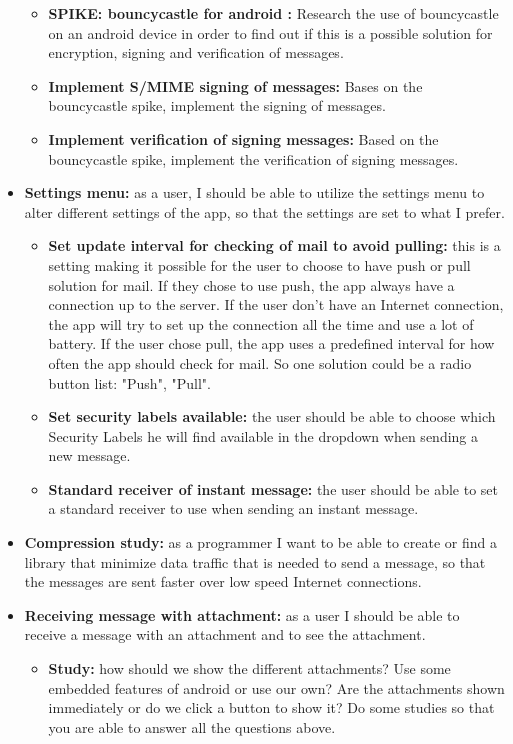 \begin{itemize}
\begin{itemize}
\item{}\textbf{SPIKE: bouncycastle for android :} Research the use of bouncycastle on an android device in order to find out if this is a possible solution for encryption, signing and verification of messages.
\item{}\textbf{Implement S/MIME signing of messages:} Bases on the bouncycastle spike, implement the signing of messages. 
\item{}\textbf{Implement verification of signing messages:} Based on the bouncycastle spike, implement the verification of signing messages.
\end{itemize}

\newpage

\item{}\textbf{Settings menu:} as a user, I should be able to utilize the settings menu to alter different settings of the app, so that the settings are set to what I prefer.
\begin{itemize}
\item{}\textbf{Set update interval for checking of mail to avoid pulling:} this is a setting making it possible for the user to choose to have push or pull solution for mail. If they chose to use push, the app always have a connection up to the server. If the user don’t have an Internet connection, the app will try to set up the connection all the time and use a lot of battery. If the user chose pull, the app uses a predefined interval for how often the app should check for mail. So one solution could be a radio button list: "Push", "Pull".
\item{}\textbf{Set security labels available:} the user should be able to choose which Security Labels he will find available in the dropdown when sending a new message.
\item{}\textbf{Standard receiver of instant message:} the user should be able to set a standard receiver to use when sending an instant message.
\end{itemize}
\item{}\textbf{Compression study:} as a programmer I want to be able to create or find a library that minimize data traffic that is needed to send a message, so that the messages are sent faster over low speed Internet connections.
\item{}\textbf{Receiving message with attachment:} as a user I should be able to receive a message with an attachment and to see the attachment.
\begin{itemize}
\item{}\textbf{Study:} how should we show the different attachments? Use some embedded features of android or use our own? Are the attachments shown immediately or do we click a button to show it? Do some studies so that you are able to answer all the questions above.

\end{itemize}
\end{itemize}
